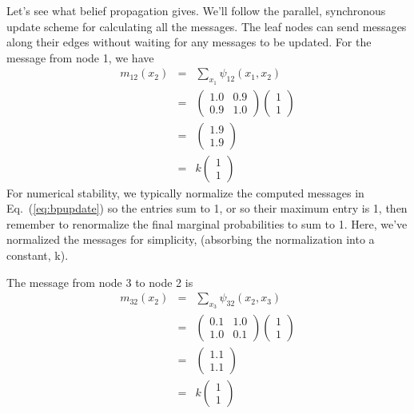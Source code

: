 Let's see what belief propagation gives.  We'll
follow the parallel, synchronous update scheme for calculating
all the messages.  The leaf nodes can send messages along their
edges without waiting for any messages to be updated.  For the message
from node 1, we have
\begin{eqnarray} 
m_{12}(x_2) & = & \sum_{x_1} \psi_{12} (x_1, x_2)  \\
& = & 
\left( 
\begin{array}{cc} 
1.0 & 0.9 \\ 
0.9 & 1.0 
\end{array}
\right) 
\left( 
\begin{array}{c} 
1 \\ 
1
\end{array}
\right) 
 \\
& = &
\left( 
\begin{array}{c} 
1.9 \\ 
1.9
\end{array}
\right) \\
&  = &
k
\left( 
\begin{array}{c} 
1 \\ 
1
\end{array}
\right) 
\end{eqnarray} 
For numerical stability, we typically normalize the computed messages in Eq.~(\ref{eq:bpupdate}) so
the entries sum to 1, or so their maximum entry is 1, then remember
to renormalize the final marginal probabilities to sum to 1.
Here, we've normalized the messages for simplicity, (absorbing the
normalization into a constant, k).

The message from node 3 to node 2 is
\begin{eqnarray}
m_{32}(x_2) & = & \sum_{x_3} \psi_{32} (x_2, x_3)  \\
& = & 
\left( 
\begin{array}{cc}
0.1 & 1.0 \\
1.0 & 0.1 
\end{array}
\right) 
\left( 
\begin{array}{c} 
1 \\ 
1
\end{array}
\right) 
 \\
& = &
\left( 
\begin{array}{c}
1.1 \\
1.1
\end{array}
\right) \\
&  = &
k
\left( 
\begin{array}{c}
1 \\
1
\end{array}
\right) 
\end{eqnarray}

